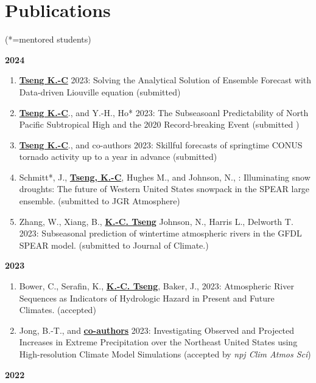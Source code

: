 \documentclass{article}
\begin{document}
\section{\color{airforceblue}Publications} (*=mentored students)\par
\normalsize{\bf{2024}} 
\begin{enumerate} 
	\item \normalsize{\bf{\underline{Tseng K.-C}}} 2023: Solving the Analytical Solution of Ensemble Forecast with Data-driven Liouville equation (submitted)
	\item \normalsize{\bf{\underline{Tseng K.-C}}}., and Y.-H., Ho* 2023: The Subseasoanl Predictability of North Pacific Subtropical High and the 2020 Record-breaking Event (submitted )
	\item \normalsize{\bf{\underline{Tseng K.-C}}}., and co-authors 2023: Skillful forecasts of springtime CONUS tornado activity up to a year in advance (submitted) 
	\item Schmitt*, J., \normalsize{\bf{\underline{Tseng, K.-C}}}, Hughes M., and Johnson, N., : Illuminating snow droughts: The future of Western United States snowpack in the SPEAR large ensemble. (submitted to JGR Atmosphere)
	\item Zhang, W., Xiang, B., \normalsize{\bf{\underline{K.-C. Tseng}}} Johnson, N., Harris L., Delworth T. 2023: Subseasonal prediction of wintertime atmospheric rivers in the GFDL SPEAR model. (submitted to Journal of Climate.)
\end{enumerate}	
\normalsize{\bf{2023}} 
\begin{enumerate}[resume] 
	
	\item Bower, C., Serafin, K., \normalsize{\bf{\underline{K.-C. Tseng}}}, Baker, J., 2023: Atmospheric River Sequences as Indicators of Hydrologic Hazard in Present and Future Climates. (accepted) \par
	\item Jong, B.-T., and \normalsize{\bf{\underline{co-authors}}} 2023: Investigating Observed and Projected Increases in Extreme Precipitation over the Northeast United States using High-resolution Climate Model Simulations  (accepted by \textit{npj Clim Atmos Sci}) \par

\end{enumerate}	
\normalsize{\bf{2022}} 
\end{document}
